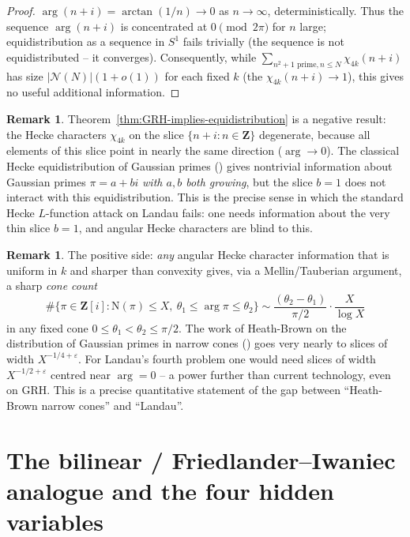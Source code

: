 \documentclass[11pt]{article}
\theoremstyle{definition}
\newtheorem{remark}[theorem]{Remark}
\newcommand{\Z}{\mathbf{Z}}
\newcommand{\Norm}{\mathrm{N}}
\begin{document}
\begin{proof}
$\arg(n+i) = \arctan(1/n) \to 0$ as $n \to \infty$, deterministically. Thus the sequence
$\arg(n+i)$ is concentrated at $0 \pmod{2\pi}$ for $n$ large; equidistribution as a sequence
in $S^1$ fails trivially (the sequence is not equidistributed -- it converges).
Consequently, while $\sum_{n^2+1\text{ prime}, n\le N} \chi_{4k}(n+i)$ has size
$|\mathcal{N}(N)|(1 + o(1))$ for each fixed $k$ (the $\chi_{4k}(n+i) \to 1$), this gives no
useful additional information.
\end{proof}

\begin{remark}\label{rmk:why-Hecke-fails-for-n2plus1}
Theorem~\ref{thm:GRH-implies-equidistribution} is a negative result: the Hecke characters
$\chi_{4k}$ on the slice $\{n + i : n \in \Z\}$ degenerate, because all elements of this
slice point in nearly the same direction ($\arg \to 0$). The classical Hecke equidistribution
of Gaussian primes (\cite{hecke1920}) gives nontrivial information about Gaussian primes
$\pi = a + bi$ \emph{with $a, b$ both growing}, but the slice $b = 1$ does not interact
with this equidistribution.
This is the precise sense in which the standard Hecke $L$-function attack on Landau
fails: one needs information about the very thin slice $b = 1$, and angular Hecke
characters are blind to this.
\end{remark}

\begin{remark}\label{rmk:positive-side-of-the-coin}
The positive side: \emph{any} angular Hecke character information that is uniform in $k$
and sharper than convexity gives, via a Mellin/Tauberian argument, a sharp \emph{cone
count}
\[
   \#\{\pi \in \Z[i] : \Norm(\pi) \le X,\ \theta_1 \le \arg\pi \le \theta_2\}
   \sim \frac{(\theta_2 - \theta_1)}{\pi/2} \cdot \frac{X}{\log X}
\]
in any fixed cone $0 \le \theta_1 < \theta_2 \le \pi/2$. The work of Heath-Brown on the
distribution of Gaussian primes in narrow cones (\cite{HB80}) goes very nearly to slices
of width $X^{-1/4 + \varepsilon}$. For Landau's fourth problem one would need slices of width
$X^{-1/2 + \varepsilon}$ centred near $\arg = 0$ -- a power further than current
technology, even on GRH. This is a precise quantitative statement of the gap between
``Heath-Brown narrow cones'' and ``Landau''.
\end{remark}

\section{The bilinear / Friedlander--Iwaniec analogue and the four hidden variables}\label{sec:spin}
\end{document}
